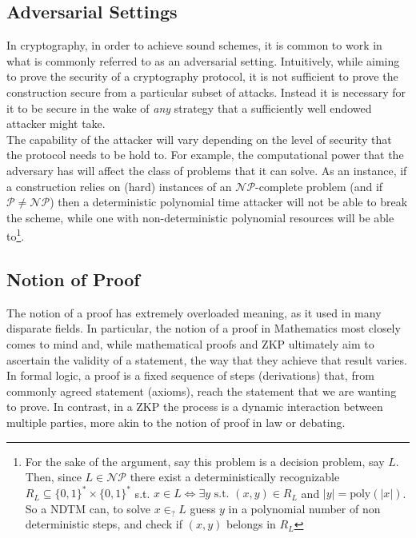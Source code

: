 \documentclass{article}
\begin{document}
\subsection{Adversarial Settings}
In cryptography, in order to achieve sound schemes, it is common to work in what is commonly referred to as an adversarial setting.
Intuitively, while aiming to prove the security of a cryptography protocol, it is not sufficient to prove the construction secure from a particular subset of attacks. Instead it is necessary for it to be secure in the wake of \textit{any} strategy that a sufficiently well endowed attacker might take. \\

The capability of the attacker will vary depending on the level of security that the protocol needs to be hold to. For example, the computational power that the adversary has will affect the class of problems that it can solve.
As an instance, if a construction relies on (hard) instances of an $\mathcal{NP}$-complete problem (and if $\mathcal{P} \neq \mathcal{NP}$) then a deterministic polynomial time attacker will not be able to break the scheme, while one with non-deterministic polynomial resources will be able to\footnote{For the sake of the argument, say this problem is a decision problem, say $L$. Then, since $L \in \mathcal{NP}$ there exist a deterministically recognizable $R_L \subseteq \{0, 1\}^* \times \{0, 1\}^* $ s.t. $x \in L \iff \exists y \text{ s.t. } (x, y) \in R_L$ and $|y| = \text{poly}(|x|)$. So a NDTM can, to solve $x \in_? L$ guess $y$ in a polynomial number of non deterministic steps, and check if $(x, y)$ belongs in $R_L$ }.


\subsection{Notion of Proof}
The notion of a proof has extremely overloaded meaning, as it used in many disparate fields. In particular, the notion of a proof in Mathematics most closely comes to mind and, while mathematical proofs and ZKP ultimately aim to ascertain the validity of a statement, the way that they achieve that result varies. In formal logic, a proof is a fixed sequence of steps (derivations) that, from commonly agreed statement (axioms), reach the statement that we are wanting to prove. In contrast, in a ZKP the process is a dynamic interaction between multiple parties, more akin to the notion of proof in law or debating. 
\end{document}

